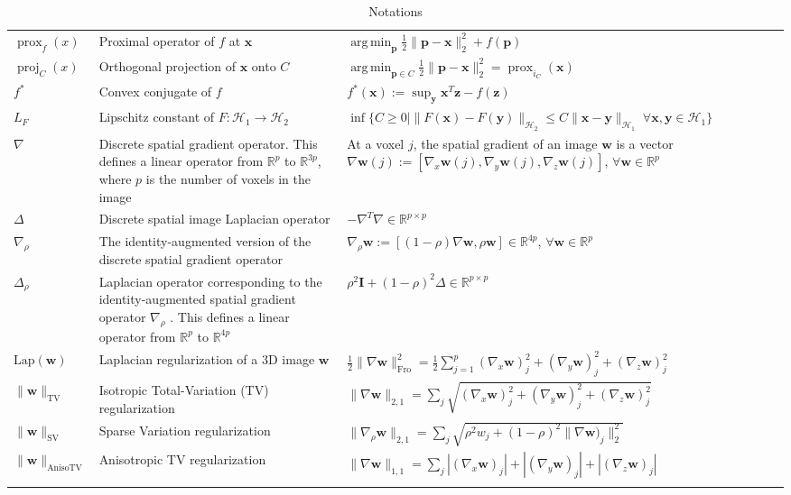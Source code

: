\documentclass[nobib, a4paper, notoc, twoside, justified, openany]{tufte-book}
\DeclareMathOperator*{\argmin}{arg\,min}
\providecommand{\B}[1]{\mathbf{#1}}
\DeclareMathOperator{\proj}{proj}
\DeclareMathOperator{\prox}{prox}
\def\y{\mathbf{y}}
\def\I{\mathbf{I}}
\def\x{\mathbf{x}}
\def\w{\mathbf{w}}
\begin{document}
\begin{fullwidth}
\begin{longtable}{p{2cm} | p{6cm} | p{9cm}}
  $\prox_f(x)$ & Proximal operator of $f$ at $\B{x}$ & $\argmin_{\B{p}}\frac{1}{2}\|\B{p}-\B{x}\|_2^2 + f(\B{p})$\\

  $\proj_C(x)$ & Orthogonal projection of $\B{x}$ onto $C$ & $\argmin_{\B{p} \in C}\frac{1}{2}\|\B{p}-\B{x}\|_2^2 = \prox_{i_C}(\B{x})$\\
  $f^*$ & Convex conjugate of $f$ & $f^*(\B{x}) := \sup_{\B{y}}\B{x}^T\B{z} - f(\B{z})$\\
  $L_F$ & Lipschitz constant of $F: \mathcal H_1 \rightarrow \mathcal H_2$ & $\inf\{C \ge 0 | \|F(\x) - F(\y)\|_{\mathcal H_2} \le C\|\x - \y\|_{\mathcal H_1}\;\forall \x,\y \in \mathcal H_1\}$ \\
  \midrule

  $\nabla $ & Discrete spatial gradient operator. This defines a linear operator from $\mathbb R^p$ to $\mathbb R^{3p}$, where $p$ is the number of voxels in the image & At a voxel $j$, the spatial gradient of an image $\B{w}$ is a vector ${\nabla } {\w}(j) := [\nabla_{x} {\w}(j), \nabla_{y} {\w}(j), \nabla_{z} {\w}(j)]$, $\forall \w \in \mathbb R^p$ \\
  
  $\Delta$ & Discrete spatial image Laplacian operator & $-\nabla ^T\nabla  \in \mathbb R^{p \times p}$\\
  $\nabla_\rho$ & The identity-augmented version of the discrete spatial gradient operator & ${\nabla_\rho} {\w} := [(1-\rho)\nabla \w, \rho \w] \in \mathbb R^{4p}$, $\forall \w \in \mathbb R^p$ \\
  $\Delta_\rho$ & Laplacian operator corresponding to the identity-augmented spatial gradient operator $\nabla_\rho$ . This defines a linear operator from $\mathbb R^p$ to $\mathbb R^{4p}$ & $\rho^2\I + (1-\rho)^2\Delta \in \mathbb R^{p \times p}$ \\
  
  $\text{Lap}(\B{w})$ & Laplacian regularization of a 3D image $\B{w}$ & $\frac{1}{2}\|\nabla \w\|_\text{Fro}^2 = \frac{1}{2}\sum_{j=1}^p(\nabla_x \B{w})_j^2 + (\nabla_y \B{w})_j^2 + (\nabla_z \B{w})_j^2$ \\ %
  $\|\B{w}\|_{\text{TV}}$ & Isotropic Total-Variation (TV) regularization & $\|\nabla \w\|_{2,1} =
\sum_{j}\sqrt{(\nabla_x \B{w})_j^2 + (\nabla_y \B{w})_j^2 + (\nabla_z \B{w})_j^2}$\\
  $\|\B{w}\|_{\text{SV}}$ & Sparse Variation regularization & $\|\nabla_\rho \w\|_{2,1} = \sum_{j}\sqrt{\rho^2 w_j + (1-\rho)^2\|\nabla \w)_j\|_2^2}$\\  
  $\|\B{w}\|_{\text{AnisoTV}}$ & Anisotropic TV regularization & $\|\nabla \w\|_{1,1} = 
\sum_{j}|(\nabla_x \B{w})_j| + |(\nabla_y \B{w})_j| + |(\nabla_z \B{w})_j|$\\
  

  

  \bottomrule
\caption{Notations}  
  \label{Tab:notations}
\end{longtable}
\end{fullwidth}
\end{document}
